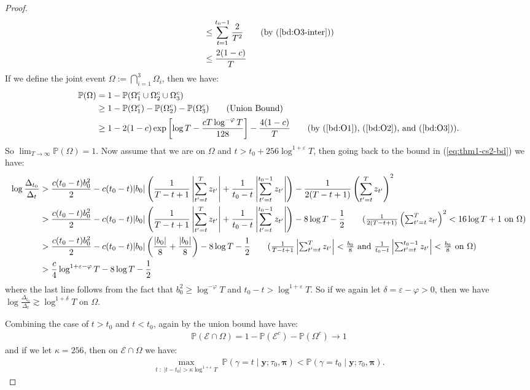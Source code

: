 \begin{proof}
\begin{align}
    &\leq \sum_{t = 1}^{t_0-1} \frac{2}{T^2} \tag{by (\ref{bd:O3-inter})} \\
    &\leq \frac{2(1- c)}{T} \label{bd:O3} 
\end{align}
If we define the joint event $\Omega := \bigcap_{i=1}^3 \Omega_i$, then we have:
\begin{align*}
    \mathbb{P}(\Omega) &= 1 - \mathbb{P}(\Omega^c_1 \cup \Omega^c_2 \cup \Omega^c_3) \\
    &\geq 1 - \mathbb{P}(\Omega^c_1) - \mathbb{P}(\Omega^c_2) - \mathbb{P}(\Omega^c_3) \tag{Union Bound}  \\
    &\geq 1 - 2 (1-c)\exp\left[\log T - \frac{cT\log^{-\varphi}T}{128}\right] - \frac{4(1-c)}{T} \tag{by (\ref{bd:O1}), (\ref{bd:O2}), and (\ref{bd:O3})}.
\end{align*}
So $\lim_{T\to\infty}\mathbb{P}(\Omega) = 1$. Now assume that we are on $\Omega$ and $t > t_0 + 256 \log^{1+\varepsilon}T$, then going back to the bound in (\ref{eq:thm1-cs2-bd}) we have:
\begin{align*}
    \log \frac{\Delta_{t_0}}{\Delta_t} &> \frac{c (t_0-t)b_0^2 }{2} - c(t_0 -t) |b_0| \left(\frac{1}{T-t+1}\left|\sum_{t'=t}^{T} z_{t'}\right| + \frac{1}{t_0-t}\left|\sum_{t'=t}^{t_0-1} z_{t'}\right|\right) -\frac{1}{2(T-t+1)}\left(\sum_{t'=t}^{T} z_{t'}\right)^2 \\
    &> \frac{c (t_0-t)b_0^2 }{2} - c(t_0 -t) |b_0| \left(\frac{1}{T-t+1}\left|\sum_{t'=t}^{T} z_{t'}\right| + \frac{1}{t_0-t}\left|\sum_{t'=t}^{t_0-1} z_{t'}\right|\right) -8\log T - \frac{1}{2} \tag{$\frac{1}{2(T-t+1)}\left(\sum_{t'=t}^{T} z_{t'}\right)^2 < 16\log T + 1$ on $\Omega$} \\
    &> \frac{c (t_0-t)b_0^2 }{2} - c(t_0 -t) |b_0| \left(\frac{|b_0|}{8} + \frac{|b_0|}{8}\right) -8\log T - \frac{1}{2} \tag{$\frac{1}{T-t+1}\left|\sum_{t'=t}^{T} z_{t'}\right| < \frac{b_0}{8}$ and $\frac{1}{t_0-t}\left|\sum_{t'=t}^{t_0-1} z_{t'}\right| < \frac{b_0}{8}$ on $\Omega$} \\
    &> \frac{c}{4}\log^{1+\varepsilon-\varphi} T -8\log T - \frac{1}{2}
\end{align*}
where the last line follows from the fact that $b_0^2 \geq \log^{-\varphi} T$ and $t_0 - t > \log^{1+\varepsilon} T$. So if we again let $\delta = \varepsilon -\varphi >0$, then we have $\log \frac{\Delta_{t_0}}{\Delta_t} \gtrsim \log^{1+\delta} T$ on $\Omega$.

Combining the case of $t > t_0$ and $t < t_0$, again by the union bound have have:
\begin{align*}
    \mathbb{P}(\mathcal{E} \cap \Omega) = 1 - \mathbb{P}(\mathcal{E}^c) -\mathbb{P}(\Omega^c) \to 1
\end{align*}
and if we let $\kappa = 256$, then on $\mathcal{E} \cap \Omega$ we have:
\begin{align*}
    \max_{t \;:\; |t - t_0| > \kappa \log^{1+\varepsilon} T} \; \mathbb{P}(\gamma = t  \;|\; \mathbf{y} ; \tau_0,\pmb{\pi}) < \mathbb{P}(\gamma = t_0  \;|\; \mathbf{y} ; \tau_0,\pmb{\pi}).
\end{align*}
\end{proof}